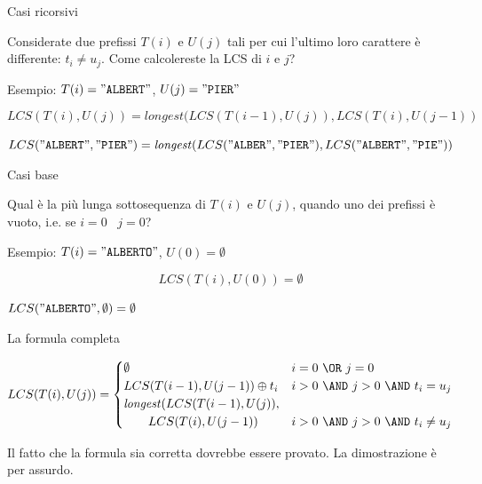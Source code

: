 \begin{frame}{Casi ricorsivi}

\vspace{-9pt}

Considerate due prefissi $T(i)$ e $U(j)$ tali per cui l'ultimo loro
carattere è differente: $t_i \neq u_j$. Come calcolereste la  LCS di $i$ e $j$?

\BIL
\item Esempio: $T(i)="\texttt{ALBERT}"$, $U(j)="\texttt{PIER}"$
\EIL

\bigskip
{}
\pause
\[
  LCS(T(i), U(j)) = \mathit{longest}( LCS(T(i-1), U(j)), LCS(T(i), U(j-1))
\]

\BIL
\item $LCS("\texttt{ALBERT}","\texttt{PIER}") = \mathit{longest}(
  LCS("\texttt{ALBER}","\texttt{PIER}"),
  LCS("\texttt{ALBERT}","\texttt{PIE}") )$
\EIL

\end{frame}

\begin{frame}{Casi base}
  

\vspace{-9pt}

Qual è la più lunga sottosequenza di $T(i)$ e $U(j)$, quando uno dei
prefissi è vuoto, i.e. se $i=0$ \OR\ $j=0$?
\BIL
\item Esempio: $T(i)="\texttt{ALBERTO}"$, $U(0)=\emptyset$
\EIL

\pause
\bigskip
{}
\[
  LCS(T(i), U(0)) = \emptyset
\]

\BIL
\item $LCS("\texttt{ALBERTO}", \emptyset ) = \emptyset $
\EIL

\end{frame}

\begin{frame}{La formula completa}

\vspace{-9pt}
\begingroup
\footnotesize
\[
  LCS(T(i), U(j)) = \begin{cases}
  \emptyset & i=0\ \OR\ j=0 \\
  LCS(T(i-1), U(j-1)) \oplus t_i  & i>0\ \AND\ j>0\ \AND\ t_i = u_j \\
  \mathit{longest}( LCS(T(i-1),U(j)),  \\
  \qquad LCS(T(i), U(j-1)) & i>0\ \AND\ j>0\ \AND\ t_i \neq u_j 
  \end{cases}
\]
\endgroup

\bigskip
{}
Il fatto che la formula sia corretta dovrebbe essere provato. La dimostrazione
è per assurdo.
%

\end{frame}

